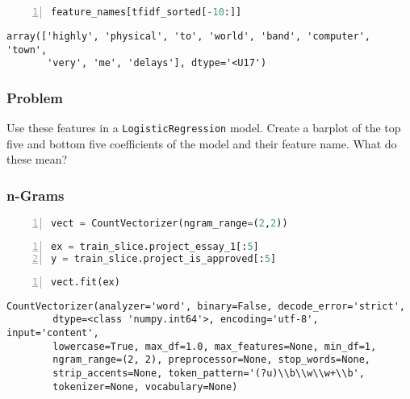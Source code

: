 \documentclass[10pt,parskip=half,
	toc=sectionentrywithdots,
	bibliography=totocnumbered,
	captions=tableheading,numbers=noendperiod]{scrartcl}
\begin{document}
\begin{lstlisting}[language=Python,numbers=left,xleftmargin=20pt,xrightmargin=5pt,belowskip=5pt,aboveskip=5pt]
feature_names[tfidf_sorted[-10:]]
\end{lstlisting}

\begin{lstlisting}[language={},postbreak={},numbers=none,xrightmargin=7pt,breakindent=0pt,aboveskip=5pt,belowskip=5pt]
array(['highly', 'physical', 'to', 'world', 'band', 'computer', 'town',
       'very', 'me', 'delays'], dtype='<U17')
\end{lstlisting}

\subsubsection{Problem}\label{problem}

Use these features in a \texttt{LogisticRegression} model. Create a
barplot of the top five and bottom five coefficients of the model and
their feature name. What do these mean?

\subsubsection{n-Grams}\label{n-grams}

\begin{lstlisting}[language=Python,numbers=left,xleftmargin=20pt,xrightmargin=5pt,belowskip=5pt,aboveskip=5pt]
vect = CountVectorizer(ngram_range=(2,2))
\end{lstlisting}

\begin{lstlisting}[language=Python,numbers=left,xleftmargin=20pt,xrightmargin=5pt,belowskip=5pt,aboveskip=5pt]
ex = train_slice.project_essay_1[:5]
y = train_slice.project_is_approved[:5]
\end{lstlisting}

\begin{lstlisting}[language=Python,numbers=left,xleftmargin=20pt,xrightmargin=5pt,belowskip=5pt,aboveskip=5pt]
vect.fit(ex)
\end{lstlisting}

\begin{lstlisting}[language={},postbreak={},numbers=none,xrightmargin=7pt,breakindent=0pt,aboveskip=5pt,belowskip=5pt]
CountVectorizer(analyzer='word', binary=False, decode_error='strict',
        dtype=<class 'numpy.int64'>, encoding='utf-8', input='content',
        lowercase=True, max_df=1.0, max_features=None, min_df=1,
        ngram_range=(2, 2), preprocessor=None, stop_words=None,
        strip_accents=None, token_pattern='(?u)\\b\\w\\w+\\b',
        tokenizer=None, vocabulary=None)
\end{lstlisting}
\end{document}
